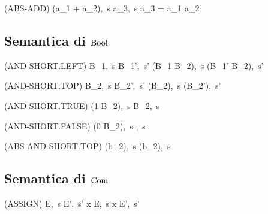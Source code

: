 \begin{center}
	(ABS-ADD)
	\prooftree
		\justifies
		\langle (a_1 + a_2),\ s \rangle \rightarrow \langle a_3,\ s \rangle 
		\using a_3 = a_1 \absadd a_2
	\endprooftree
\end{center}

\subsection{Semantica di $\mathrm{Bool}$}

\begin{center}
	(AND-SHORT.LEFT)
	\prooftree
		\langle B_1,\ s \rangle \rightarrow \langle B_1',\ s' \rangle
		\justifies
		\langle (B_1 \wedge B_2),\ s \rangle \rightarrow \langle (B_1' \wedge B_2),\ s' \rangle
	\endprooftree
\end{center}

\begin{center}
	(AND-SHORT.TOP)
	\prooftree
		\langle B_2,\ s \rangle \rightarrow \langle B_2',\ s' \rangle
		\justifies
		\langle (\top \wedge B_2),\ s \rangle \rightarrow \langle (\top \wedge B_2'),\ s' \rangle
	\endprooftree
\end{center}

\begin{center}
	(AND-SHORT.TRUE)
	\prooftree
		\justifies
		\langle (1 \wedge B_2),\ s \rangle \rightarrow \langle B_2,\ s \rangle
	\endprooftree
\end{center}

\begin{center}
	(AND-SHORT.FALSE)
	\prooftree
		\justifies
		\langle (0 \wedge B_2),\ s \rangle \rightarrow {},\ s \rangle
	\endprooftree
\end{center}

\begin{center}
	(ABS-AND-SHORT.TOP)
	\prooftree
		\justifies
		\langle (\top \wedge b_2),\ s \rangle \rightarrow \langle (\top \absand b_2),\ s \rangle
	\endprooftree
\end{center}

\subsection{Semantica di $\mathrm{Com}$}

\begin{center}
	(ASSIGN)
	\prooftree
		\langle E,\ s \rangle \rightarrow \langle E',\ s' \rangle
		\justifies
		\langle x \weq E,\ s \rangle \rightarrow \langle x \weq E',\ s' \rangle
	\endprooftree
\end{center}


